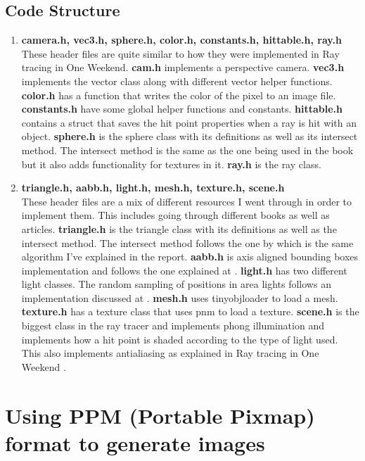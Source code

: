 \documentclass[11pt,a4paper]{article}
\begin{document}
	\subsection{Code Structure}
	\begin{enumerate}
		\item \textbf{camera.h, vec3.h, sphere.h, color.h, constants.h, hittable.h, ray.h} \\
		These header files are quite similar to how they were implemented in Ray tracing in One Weekend. \textbf{cam.h} implements a perspective camera. \textbf{vec3.h} implements the vector class along with different vector helper functions. \textbf{color.h} has a function that writes the color of the pixel to an image file. \textbf{constants.h} have some global helper functions and constants.  \textbf{hittable.h} contains a struct that saves the hit point properties when a ray is hit with an object. \textbf{sphere.h} is the sphere class with its definitions as well as its intersect method. The intersect method is the same as the one being used in the book but it also adds functionality for textures in it. \textbf{ray.h} is the ray class.
		
		\item \textbf{triangle.h, aabb.h, light.h, mesh.h, texture.h, scene.h} \\
		These header files are a mix of different resources I went through in order to implement them. This includes going through different books as well as articles. \textbf{triangle.h} is the triangle class with its definitions as well as the intersect method. The intersect method follows the one by \cite{raytriangle} which is the same algorithm I've explained in the report. \textbf{aabb.h} is axis aligned bounding boxes implementation and follows the one explained at \cite{scratchapixel}. \textbf{light.h} has two different light classes. The random sampling of positions in area lights follows an implementation discussed at \cite{stackoverflow}. \textbf{mesh.h} uses tinyobjloader to load a mesh. \textbf{texture.h} has a texture class that uses pnm to load a texture. \textbf{scene.h} is the biggest class in the ray tracer and implements phong illumination and implements how a hit point is shaded according to the type of light used. This also implements antialiasing as explained in Ray tracing in One Weekend \cite{Shirley2020RTW1}.
		
	\end{enumerate}
	
	\section{Using PPM (Portable Pixmap) format to generate images}
	
\end{document}
